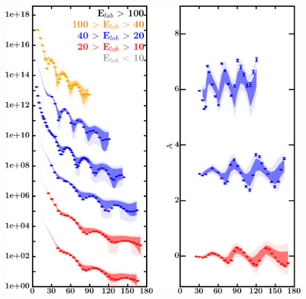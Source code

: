 \documentclass[twocolumn,secnumarabic,amssymb, nobibnotes, aps, prl,
superscriptaddress, nobalancelastpage, draft]{revtex4}
\begin{document}
\begin{figure}[!htb]
    \centering
    \begin{minipage}{0.4\linewidth}
        \centering
        \includegraphics[width=\linewidth]{figures/sn124_protonElastic.png}
        \label{DOM_sn124_proton_elastic}
    \end{minipage}\hspace{6pt}
    \begin{minipage}{0.4\linewidth}
        \centering

\end{minipage}
\end{figure}
\end{document}
